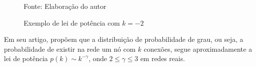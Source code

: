 \documentclass[12pt,a4paper,final]{article}
\newcommand{\source}[1]{\vspace{-10pt} \caption*{Fonte: {#1}} }
\begin{document}
\begin{figure}[ht]
    \centering
    \caption{Exemplo de lei de potência com $k = -2$}
    \label{fig:exemplo-lei-potencia}
    \source{Elaboração do autor}
\end{figure}

Em seu artigo,  propõem que a distribuição de probabilidade de grau, ou seja, a probabilidade de existir na rede um nó com $k$ conexões, segue aproximadamente a lei de potência $p(k) \sim k^{-\gamma} $, onde $2 \le \gamma \le 3$ em redes reais.
\end{document}
